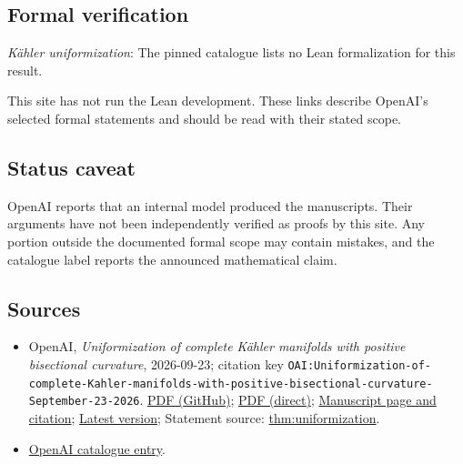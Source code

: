\documentclass[11pt]{article}
\begin{document}
\subsection{Formal verification}
\textit{Kähler uniformization}: The pinned catalogue lists no Lean formalization for this result.

This site has not run the Lean development. These links describe OpenAI’s selected formal statements and should be read with their stated scope.

\subsection{Status caveat}
OpenAI reports that an internal model produced the manuscripts. Their arguments have not been independently verified as proofs by this site. Any portion outside the documented formal scope may contain mistakes, and the catalogue label reports the announced mathematical claim.

\subsection{Sources}
\begin{itemize}
\item OpenAI, \emph{Uniformization of complete Kähler manifolds with positive bisectional curvature}, 2026-09-23; citation key \texttt{OAI:Uniformization-of-complete-Kahler-manifolds-with-positive-bisectional-curvature-September-23-2026}. \href{https://github.com/openai/math/blob/adc7f1241b42e322a6451854ab7e4b4c146bf78a/preprints/Uniformization-of-complete-Kahler-manifolds-with-positive-bisectional-curvature-September-23-2026/paper.pdf}{PDF (GitHub)}; \href{https://github.com/openai/math/raw/adc7f1241b42e322a6451854ab7e4b4c146bf78a/preprints/Uniformization-of-complete-Kahler-manifolds-with-positive-bisectional-curvature-September-23-2026/paper.pdf}{PDF (direct)}; \href{https://github.com/openai/math/blob/adc7f1241b42e322a6451854ab7e4b4c146bf78a/preprints/Uniformization-of-complete-Kahler-manifolds-with-positive-bisectional-curvature-September-23-2026/README.md}{Manuscript page and citation}; \href{https://github.com/openai/math/blob/main/preprints/Uniformization-of-complete-Kahler-manifolds-with-positive-bisectional-curvature-September-23-2026/paper.pdf}{Latest version}; Statement source: \href{https://github.com/openai/math/blob/adc7f1241b42e322a6451854ab7e4b4c146bf78a/preprints/Uniformization-of-complete-Kahler-manifolds-with-positive-bisectional-curvature-September-23-2026/build/sections/introduction.tex\#L8}{thm:uniformization}.
\item \href{https://github.com/openai/math/blob/adc7f1241b42e322a6451854ab7e4b4c146bf78a/CONTENTS.md}{OpenAI catalogue entry}.
\end{itemize}
\end{document}
